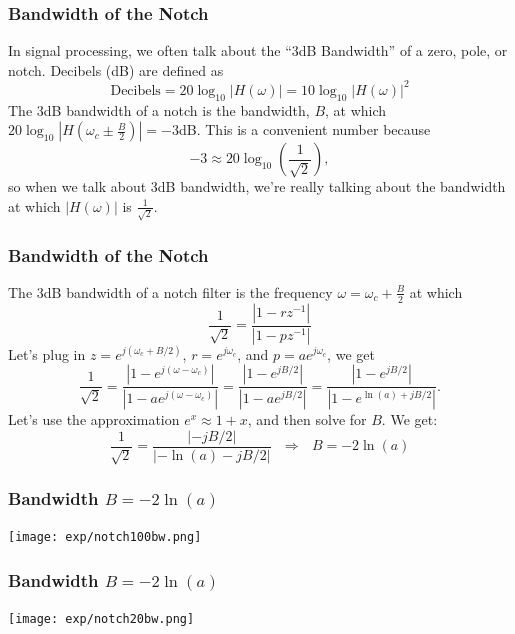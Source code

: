 \documentclass{beamer}
\begin{document}
\begin{frame}
  \frametitle{Bandwidth of the Notch}

  In signal processing, we often talk about the ``3dB Bandwidth'' of a
  zero, pole, or notch.  Decibels (dB)  are defined as
  \begin{displaymath}
    \mbox{Decibels} = 20\log_{10}|H(\omega)| = 10\log_{10}|H(\omega)|^2
  \end{displaymath}
  The 3dB bandwidth of a notch is the bandwidth, $B$, at which
  $20\log_{10}{|H\left(\omega_c\pm \frac{B}{2}\right)|}=-3$dB.
  This is a convenient number because
  \begin{displaymath}
    -3 \approx 20\log_{10}\left(\frac{1}{\sqrt{2}}\right),
  \end{displaymath}
  so when we talk about 3dB bandwidth, we're really talking about the
  bandwidth at which ${|H(\omega)|}$
  is $\frac{1}{\sqrt{2}}$.
\end{frame}

\begin{frame}
  \frametitle{Bandwidth of the Notch}

  The 3dB bandwidth of a notch filter is the frequency
  $\omega=\omega_c+\frac{B}{2}$ at which
  \begin{displaymath}
    \frac{1}{\sqrt{2}} = \frac{|1-rz^{-1}|}{|1-pz^{-1}|}
  \end{displaymath}
  Let's plug in $z=e^{j(\omega_c+B/2)}$, $r=e^{j\omega_c}$, and $p=ae^{j\omega_c}$, we get
  \begin{displaymath}
    \frac{1}{\sqrt{2}} = \frac{|1-e^{j(\omega-\omega_c)}|}{|1-ae^{j(\omega-\omega_c)}|}
    = \frac{|1-e^{jB/2}|}{|1-ae^{jB/2}|}
    = \frac{|1-e^{jB/2}|}{|1-e^{\ln(a)+jB/2}|}.
  \end{displaymath}
  Let's use the approximation $e^x\approx 1+x$, and then 
  solve for $B$.  We get:
  \begin{displaymath}
    \frac{1}{\sqrt{2}}=\frac{|-jB/2|}{|-\ln(a)-jB/2|}
    ~~~\Rightarrow~~~B = - 2\ln(a)
  \end{displaymath}
\end{frame}

\begin{frame}
  \frametitle{Bandwidth $B= -2\ln(a)$}

  \centerline{\texttt{[image: exp/notch100bw.png]}}
\end{frame}
\begin{frame}
  \frametitle{Bandwidth $B= -2\ln(a)$}

  \centerline{\texttt{[image: exp/notch20bw.png]}}
\end{frame}
\end{document}
